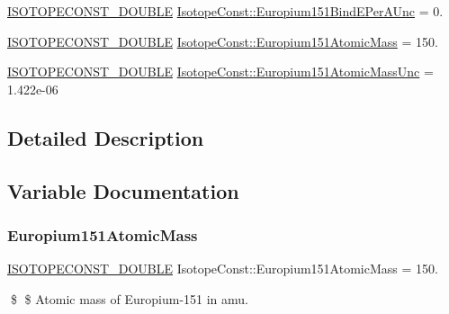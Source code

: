 \begin{DoxyCompactItemize}
\mbox{\hyperlink{group___isotope_const-_macros_ga8f45a7272ce02c0b4c65c44636ed719a}{I\+S\+O\+T\+O\+P\+E\+C\+O\+N\+S\+T\+\_\+\+D\+O\+U\+B\+LE}} \mbox{\hyperlink{group___isotope_const-_europium-_eu151_ga8283a9dc846870a9593e216a471aaae7}{Isotope\+Const\+::\+Europium151\+Bind\+E\+Per\+A\+Unc}} = 0.
\item 
\mbox{\hyperlink{group___isotope_const-_macros_ga8f45a7272ce02c0b4c65c44636ed719a}{I\+S\+O\+T\+O\+P\+E\+C\+O\+N\+S\+T\+\_\+\+D\+O\+U\+B\+LE}} \mbox{\hyperlink{group___isotope_const-_europium-_eu151_ga24c4f7c2827e424f2f043670b681eb27}{Isotope\+Const\+::\+Europium151\+Atomic\+Mass}} = 150.
\item 
\mbox{\hyperlink{group___isotope_const-_macros_ga8f45a7272ce02c0b4c65c44636ed719a}{I\+S\+O\+T\+O\+P\+E\+C\+O\+N\+S\+T\+\_\+\+D\+O\+U\+B\+LE}} \mbox{\hyperlink{group___isotope_const-_europium-_eu151_gaa9a3dd2ce90c876cd64efa0d357511c0}{Isotope\+Const\+::\+Europium151\+Atomic\+Mass\+Unc}} = 1.\+422e-\/06
\end{DoxyCompactItemize}


\subsection{Detailed Description}


\subsection{Variable Documentation}
\mbox{\label{group___isotope_const-_europium-_eu151_ga24c4f7c2827e424f2f043670b681eb27}} 
\subsubsection{\texorpdfstring{Europium151\+Atomic\+Mass}{Europium151AtomicMass}}
{\footnotesize\ttfamily \mbox{\hyperlink{group___isotope_const-_macros_ga8f45a7272ce02c0b4c65c44636ed719a}{I\+S\+O\+T\+O\+P\+E\+C\+O\+N\+S\+T\+\_\+\+D\+O\+U\+B\+LE}} Isotope\+Const\+::\+Europium151\+Atomic\+Mass = 150.}

\$ \$ Atomic mass of Europium-\/151 in amu. \mbox{\label{group___isotope_const-_europium-_eu151_gaa9a3dd2ce90c876cd64efa0d357511c0}} 
